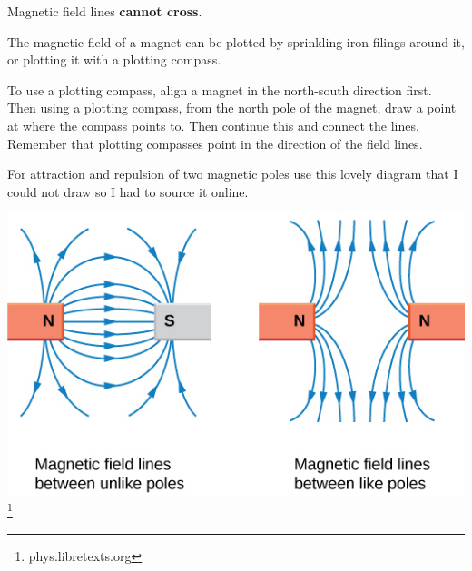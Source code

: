 \documentclass[../main.tex]{subfiles}
\begin{document}
	Magnetic field lines \textbf{cannot cross}.
	
	The magnetic field of a magnet can be plotted by sprinkling iron filings around it, or plotting it with a plotting compass.
	
	To use a plotting compass, align a magnet in the north-south direction first. Then using a plotting compass, from the north pole of the magnet, draw a point at where the compass points to. Then continue this and connect the lines. Remember that plotting compasses point in the direction of the field lines.
	
	For attraction and repulsion of two magnetic poles use this lovely diagram that I could not draw so I had to source it online.
	\begin{center}
		\includegraphics[width=0.85\linewidth]{graphics/magnetismFieldLines}\footnote{phys.libretexts.org}
	\end{center}
\end{document}
